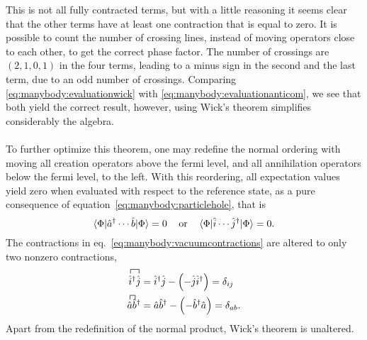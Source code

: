 This is not all fully contracted terms, but with a little reasoning it seems
clear that the other terms have at least one contraction that is equal to zero.
It is possible to count the number of crossing lines, instead of 
moving operators close to each other, to get the correct phase factor.
The number of crossings are $(2,1,0,1)$ in the four terms, leading to a minus
sign in the second and the last term, due to an odd number of crossings.
Comparing \eqref{eq:manybody:evaluationwick} with
\eqref{eq:manybody:evaluationanticom}, we see that both yield the correct result, however,
using Wick's theorem simplifies considerably the algebra.


\paragraph*{}
To further optimize this theorem, one may redefine the normal ordering with
moving all creation operators above the fermi level, and all annihilation
operators below the fermi level, to the left.
With this reordering, all expectation values yield zero when evaluated with respect to the
reference state, as a pure consequence of
equation~\eqref{eq:manybody:particlehole}, that is
\begin{equation}
\langle \Phi |\hat{a}^{\dagger} \cdots \hat{b} | \Phi \rangle = 0
\hspace{3mm}\textrm{ or }\hspace{3mm}
\langle \Phi | \hat{i} \cdots \hat{j}^{\dagger}| \Phi \rangle = 0 .
\end{equation}
The contractions in eq.~\eqref{eq:manybody:vacuumcontractions} are altered
to only two nonzero contractions,
\begin{equation}
\label{eq:manybody:referencecontractions}
\begin{split}
\contraction{}{\hat{i}}{{}^{\dagger}}{\hat{j}}
\hat{i}^{\dagger}\hat{j}
&= \hat{i}^{\dagger}\hat{j} -\left( -  \hat{j} \hat{i}^{\dagger} \right) =
\delta_{ij} \\
%
\contraction{}{\hat{a}}{}{\hat{b}}
\hat{a}\hat{b}^{\dagger}
&=
\hat{a}\hat{b}^{\dagger} - \left(- \hat{b}^{\dagger} \hat{a} \right) =
\delta_{ab}   .
\end{split}
\end{equation}
Apart from the redefinition of the normal product, Wick's theorem is unaltered.






